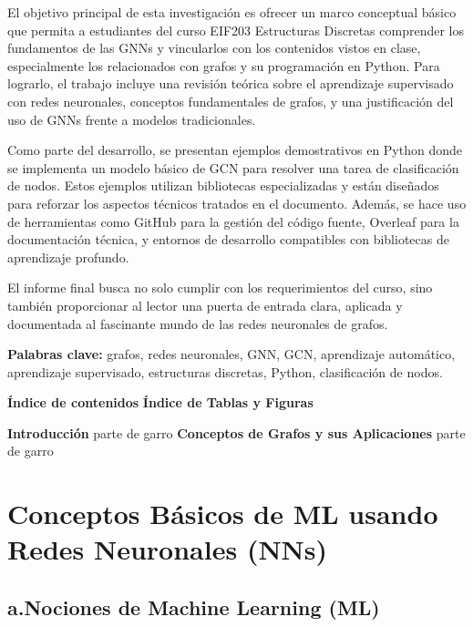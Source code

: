 \documentclass[11pt]{article} %
\begin{document}
El objetivo principal de esta investigación es ofrecer un marco conceptual básico que permita a estudiantes del curso EIF203 Estructuras Discretas comprender los fundamentos de las GNNs y vincularlos con los contenidos vistos en clase, especialmente los relacionados con grafos y su programación en Python. Para lograrlo, el trabajo incluye una revisión teórica sobre el aprendizaje supervisado con redes neuronales, conceptos fundamentales de grafos, y una justificación del uso de GNNs frente a modelos tradicionales.

Como parte del desarrollo, se presentan ejemplos demostrativos en Python donde se implementa un modelo básico de GCN para resolver una tarea de clasificación de nodos. Estos ejemplos utilizan bibliotecas especializadas y están diseñados para reforzar los aspectos técnicos tratados en el documento. Además, se hace uso de herramientas como GitHub para la gestión del código fuente, Overleaf para la documentación técnica, y entornos de desarrollo compatibles con bibliotecas de aprendizaje profundo.

El informe final busca no solo cumplir con los requerimientos del curso, sino también proporcionar al lector una puerta de entrada clara, aplicada y documentada al fascinante mundo de las redes neuronales de grafos.

\vspace{5pt}
\textbf{Palabras clave:} grafos, redes neuronales, GNN, GCN, aprendizaje automático, aprendizaje supervisado, estructuras discretas, Python, clasificación de nodos.

\newpage
{\large \textbf{Índice de contenidos}}
\vspace{5pt}
\tableofcontents
\newpage
{\large \textbf{Índice de Tablas y Figuras}}
\vspace{5pt}
\listoftables
\listoffigures
\newpage
{\large \textbf{Introducción}}
\vspace{5pt}
parte de garro
\newpage
{\large \textbf{Conceptos de Grafos y sus Aplicaciones}}
\vspace{5pt}
parte de garro
\newpage
{\section{Conceptos Básicos de ML usando Redes Neuronales (NNs)}} \vspace{10pt}

\subsection{a.Nociones de Machine Learning (ML)}
\vspace{5pt}
\end{document}
